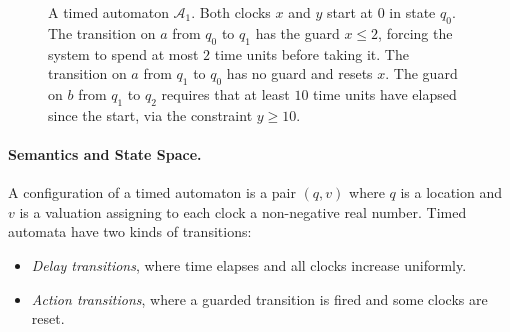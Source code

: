 \begin{figure}[t]
\centering
{}
\caption{A timed automaton \(\mathcal{A}_1\). Both clocks \(x\) and \(y\) start at \(0\) in state \(q_0\). The transition on \(a\) from \(q_0\) to \(q_1\) has the guard \(x \leq 2\), forcing the system to spend at most \(2\) time units before taking it. The transition on \(a\) from \(q_1\) to \(q_0\) has no guard and resets \(x\). The guard on \(b\) from \(q_1\) to \(q_2\) requires that at least \(10\) time units have elapsed since the start, via the constraint \(y \geq 10\).}
\label{fig:ab}
\end{figure}

\paragraph{Semantics and State Space.}
A configuration of a timed automaton is a pair \((q,v)\) where \(q\) is a location and \(v\) is a valuation assigning to each clock a non-negative real number. Timed automata have two kinds of transitions:
\begin{itemize}
  \item \emph{Delay transitions}, where time elapses and all clocks increase uniformly.
  \item \emph{Action transitions}, where a guarded transition is fired and some clocks are reset.
\end{itemize}

